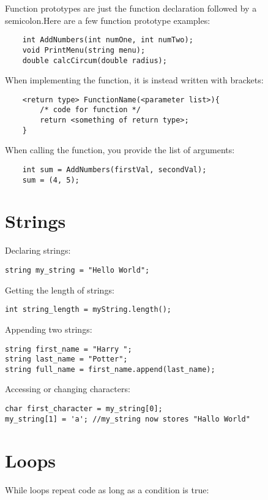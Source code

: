 Function prototypes are just the function declaration followed by a semicolon.Here are a few function prototype examples:

\begin{verbatim}
    int AddNumbers(int numOne, int numTwo);
    void PrintMenu(string menu);
    double calcCircum(double radius);
\end{verbatim}

When implementing the function, it is instead written with brackets:

\begin{verbatim}
    <return type> FunctionName(<parameter list>){
        /* code for function */
        return <something of return type>;
    }
\end{verbatim}

When calling the function, you provide the list of arguments:

\begin{verbatim}
    int sum = AddNumbers(firstVal, secondVal);
    sum = (4, 5);
\end{verbatim}

\section{Strings}

Declaring strings:

\begin{verbatim}
string my_string = "Hello World";
\end{verbatim}

Getting the length of strings:

\begin{verbatim}
int string_length = myString.length();
\end{verbatim}

Appending two strings:

\begin{verbatim}
string first_name = "Harry ";
string last_name = "Potter";
string full_name = first_name.append(last_name);
\end{verbatim}

Accessing or changing characters:
\begin{verbatim}
char first_character = my_string[0];
my_string[1] = 'a'; //my_string now stores "Hallo World"
\end{verbatim}

\section{Loops}
While loops repeat code as long as a condition is true:

